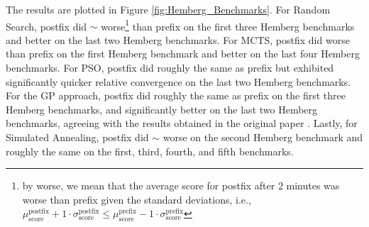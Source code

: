 \documentclass[runningheads]{llncs}
\begin{document}
The results are plotted in Figure \ref{fig:Hemberg_Benchmarks}. For Random Search, postfix did $\sim$ worse\footnote{by worse, we mean that the average score for postfix after 2 minutes was worse than prefix given the standard deviations, i.e., $\mu_\mathrm{score}^\mathrm{postfix} + 1\cdot \sigma_\mathrm{score}^\mathrm{postfix} \leq \mu_\mathrm{score}^\mathrm{prefix} - 1\cdot \sigma_\mathrm{score}^\mathrm{prefix}$} than prefix on the first three Hemberg benchmarks and better on the last two Hemberg benchmarks. For MCTS, postfix did worse than prefix on the first Hemberg benchmark and better on the last four Hemberg benchmarks. For PSO, postfix did roughly the same as prefix but exhibited significantly quicker relative convergence on the last two Hemberg benchmarks. For the GP approach, postfix did roughly the same as prefix on the first three Hemberg benchmarks, and significantly better on the last two Hemberg benchmarks, agreeing with the results obtained in the original paper \cite{hemberg2008pre}. Lastly, for Simulated Annealing, postfix did $\sim$ worse on the second Hemberg benchmark and roughly the same on the first, third, fourth, and fifth benchmarks. 
\end{document}
